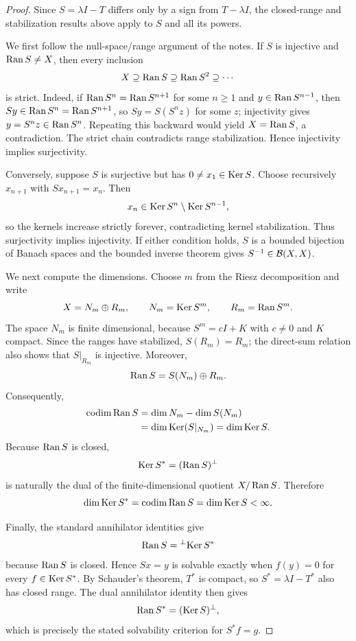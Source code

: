 \begin{proof}
Since $S=\lambda I-T$ differs only by a sign from $T-\lambda I$, the
closed-range and stabilization results above apply to $S$ and all its powers.

We first follow the null-space/range argument of the notes.  If $S$ is
injective and $\operatorname{Ran} S\ne X$, then every inclusion
\[
  X\supseteq\operatorname{Ran} S\supseteq\operatorname{Ran} S^2\supseteq\cdots
\]
is strict.  Indeed, if $\operatorname{Ran} S^n=\operatorname{Ran} S^{n+1}$ for some $n\ge1$ and
$y\in\operatorname{Ran} S^{n-1}$, then $Sy\in\operatorname{Ran} S^n=\operatorname{Ran} S^{n+1}$, so
$Sy=S(S^nz)$ for some $z$; injectivity gives $y=S^nz\in\operatorname{Ran} S^n$.
Repeating this backward would yield $X=\operatorname{Ran} S$, a contradiction.  The strict
chain contradicts range stabilization.  Hence injectivity implies
surjectivity.

Conversely, suppose $S$ is surjective but has $0\ne x_1\in\operatorname{Ker} S$.  Choose
recursively $x_{n+1}$ with $Sx_{n+1}=x_n$.  Then
\[
  x_n\in\operatorname{Ker} S^n\setminus\operatorname{Ker} S^{n-1},
\]
so the kernels increase strictly forever, contradicting kernel stabilization.
Thus surjectivity implies injectivity.  If either condition holds, $S$ is a
bounded bijection of Banach spaces and the bounded inverse theorem gives
$S^{-1}\in\mathcal{B}(X,X)$.

We next compute the dimensions.  Choose $m$ from the Riesz decomposition and
write
\[
  X=N_m\oplus R_m,
  \qquad N_m=\operatorname{Ker} S^m,
  \qquad R_m=\operatorname{Ran} S^m.
\]
The space $N_m$ is finite dimensional, because
$S^m=cI+K$ with $c\ne0$ and $K$ compact.  Since the ranges have stabilized,
$S(R_m)=R_m$; the direct-sum relation also shows that $S|_{R_m}$ is injective.
Moreover,
\[
  \operatorname{Ran} S=S(N_m)\oplus R_m.
\]
Consequently,
\[
\begin{aligned}
  \operatorname{codim}\operatorname{Ran} S
   &=\dim N_m-\dim S(N_m)\\
   &=\dim\operatorname{Ker}(S|_{N_m})
    =\dim\operatorname{Ker} S.
\end{aligned}
\]
Because $\operatorname{Ran} S$ is closed,
\[
  \operatorname{Ker} S^*=(\operatorname{Ran} S)^\perp
\]
is naturally the dual of the finite-dimensional quotient
$X/\operatorname{Ran} S$.  Therefore
\[
  \dim\operatorname{Ker} S^*=\operatorname{codim}\operatorname{Ran} S=\dim\operatorname{Ker} S<\infty.
\]

Finally, the standard annihilator identities give
\[
  \operatorname{Ran} S={}^{\perp}\!\operatorname{Ker} S^*
\]
because $\operatorname{Ran} S$ is closed.  Hence $Sx=y$ is solvable exactly when
$f(y)=0$ for every $f\in\operatorname{Ker} S^*$.  By Schauder's theorem, $T^*$ is compact,
so $S^*=\lambda I-T^*$ also has closed range.  The dual annihilator identity
then gives
\[
  \operatorname{Ran} S^*=(\operatorname{Ker} S)^\perp,
\]
which is precisely the stated solvability criterion for $S^*f=g$.
\end{proof}

